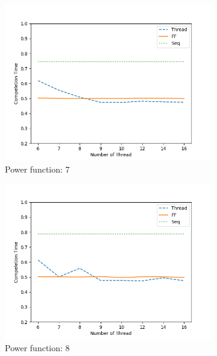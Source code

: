 \documentclass[runningheads,a4paper]{llncs}
\begin{document}
\begin{figure}[t!]
\begin{subfigure}[b]{0.3\textwidth}
		\includegraphics[scale = 0.3]{image/graph/input100/pow07}
		\caption{Power function: 7}
	\end{subfigure}
	\begin{subfigure}[b]{0.3\textwidth}
		\includegraphics[scale = 0.3]{image/graph/input100/pow08}
		\caption{Power function: 8}
	\end{subfigure}
	\begin{subfigure}[b]{0.3\textwidth}

\end{subfigure}
\end{figure}
\end{document}
